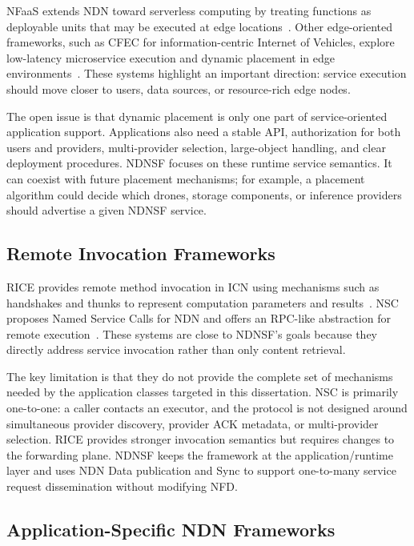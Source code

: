 NFaaS extends NDN toward serverless computing by treating functions as
deployable units that may be executed at edge locations~\cite{nfaas}. Other
edge-oriented frameworks, such as CFEC for information-centric Internet of
Vehicles, explore low-latency microservice execution and dynamic placement in
edge environments~\cite{cfec}. These systems highlight an important direction:
service execution should move closer to users, data sources, or resource-rich
edge nodes.

The open issue is that dynamic placement is only one part of service-oriented
application support. Applications also need a stable API, authorization for
both users and providers, multi-provider selection, large-object handling, and
clear deployment procedures. NDNSF focuses on these runtime service semantics.
It can coexist with future placement mechanisms; for example, a placement
algorithm could decide which drones, storage components, or inference providers
should advertise a given NDNSF service.

\subsection{Remote Invocation Frameworks}

RICE provides remote method invocation in ICN using mechanisms such as
handshakes and thunks to represent computation parameters and
results~\cite{rice}. NSC proposes Named Service Calls for NDN and offers an
RPC-like abstraction for remote execution~\cite{nsc}. These systems are close
to NDNSF's goals because they directly address service invocation rather than
only content retrieval.

The key limitation is that they do not provide the complete set of mechanisms
needed by the application classes targeted in this dissertation. NSC is
primarily one-to-one: a caller contacts an executor, and the protocol is not
designed around simultaneous provider discovery, provider ACK metadata, or
multi-provider selection. RICE provides stronger invocation semantics but
requires changes to the forwarding plane. NDNSF keeps the framework at the
application/runtime layer and uses NDN Data publication and Sync to support
one-to-many service request dissemination without modifying NFD.

\subsection{Application-Specific NDN Frameworks}

